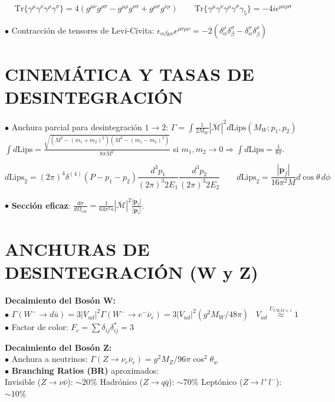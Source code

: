 $$\text{Tr}\{\gamma^\mu \gamma^\nu \gamma^\rho \gamma^\sigma\} = 4(g^{\mu\nu}g^{\rho\sigma} - g^{\mu\rho}g^{\nu\sigma} + g^{\mu\sigma}g^{\nu\rho}) \qquad \text{Tr}\{\gamma^\mu \gamma^\nu \gamma^\rho \gamma^\sigma \gamma_5\} = -4i\epsilon^{\mu\nu\rho\sigma}$$ 

$\bullet$ Contracción de tensores de Levi-Civita: $\epsilon_{\alpha\beta\mu\nu}\epsilon^{\rho\sigma\mu\nu} = -2(\delta_\alpha^\rho\delta_\beta^\sigma - \delta_\alpha^\sigma\delta_\beta^\rho)$ 

\section{CINEMÁTICA Y TASAS DE DESINTEGRACIÓN}
$\bullet$ Anchura parcial para desintegración $1 \rightarrow 2$: $\Gamma = \int \frac{1}{2M_W} |\overline{\mathcal{M}}|^2 d\text{Lips}(M_W; p_1, p_2)$\\
$\int d\text{Lips} = \frac{\sqrt{(M^2 - (m_1+m_2)^2)(M^2 - (m_1-m_2)^2)}}{8\pi M^2}$ \;\;si $m_1, m_2 \rightarrow 0 \Rightarrow \int d\text{Lips} = \frac{1}{8\pi}$.

$$d\text{Lips}_2 = (2\pi)^4 \delta^{(4)}(P - p_1 - p_2) \frac{d^3p_1}{(2\pi)^3 2E_1} \frac{d^3p_2}{(2\pi)^3 2E_2}\qquad d\text{Lips}_2 = \frac{|\mathbf{p}_f|}{16\pi^2 M} d\cos\theta \, d\phi$$

$\bullet$ \textbf{Sección eficaz}: $\frac{d\sigma}{d\Omega_{cm}} = \frac{1}{64\pi^2 s} |\overline{\mathcal{M}}|^2 \frac{|\mathbf{p}_f|}{|\mathbf{p}_i|}$. 


\section{ANCHURAS DE DESINTEGRACIÓN (W y Z)}
\textbf{Decaimiento del Bosón W:}
\\ $\bullet$ $\Gamma(W^- \to d\bar{u}) = 3 |V_{ud}|^2 \Gamma(W^- \to e^- \bar{\nu}_e) = 3 |V_{ud}|^2 ( g^2 M_W / 48\pi ) \;\;\; V_{ud} \overset{U_{CKM\approx 1}}{\approx} 1$
\\ $\bullet$ Factor de color: $F_c = \sum \delta_{ij}\delta_{ij}^* = 3$


\textbf{Decaimiento del Bosón Z:}
\\ $\bullet$ Anchura a neutrinos: $\Gamma(Z \to \nu_e \bar{\nu}_e) = g^2 M_Z/96\pi \cos^2\theta_w$ 
\\ $\bullet$ \textbf{Branching Ratios (BR)} aproximados: 
\\  Invisible ($Z \to \nu\bar{\nu}$): $\sim 20\%$ \;  Hadrónico ($Z \to q\bar{q}$): $\sim 70\%$ \; Leptónico ($Z \to l^+l^-$): $\sim 10\%$ 


